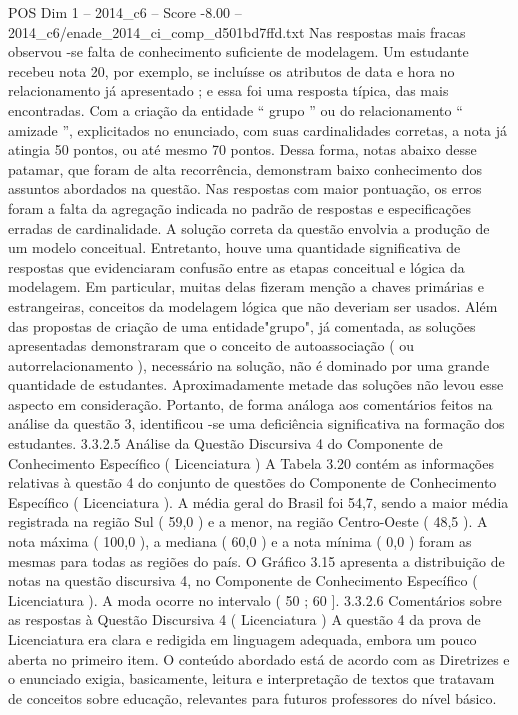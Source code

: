 \begin{textsample}{POS Dim 1 – 2014\_c6 – Score -8.00 – 2014\_c6/enade\_2014\_ci\_comp\_d501bd7ffd.txt}
Nas respostas mais fracas observou -se falta de conhecimento suficiente de modelagem.
Um estudante recebeu nota 20, por exemplo, se incluísse os atributos de data e hora no relacionamento já apresentado ; e essa foi uma resposta típica, das mais encontradas.
Com a criação da entidade “ grupo ” ou do relacionamento “ amizade ”, explicitados no enunciado, com suas cardinalidades corretas, a nota já atingia 50 pontos, ou até mesmo 70 pontos.
Dessa forma, notas abaixo desse patamar, que foram de alta recorrência, demonstram baixo conhecimento dos assuntos abordados na questão.
Nas respostas com maior pontuação, os erros foram a falta da agregação indicada no padrão de respostas e especificações erradas de cardinalidade.
A solução correta da questão envolvia a produção de um modelo conceitual.
Entretanto, houve uma quantidade significativa de respostas que evidenciaram confusão entre as etapas conceitual e lógica da modelagem.
Em particular, muitas delas fizeram menção a chaves primárias e estrangeiras, conceitos da modelagem lógica que não deveriam ser usados.
Além das propostas de criação de uma entidade"grupo", já comentada, as soluções apresentadas demonstraram que o conceito de autoassociação ( ou autorrelacionamento ), necessário na solução, não é dominado por uma grande quantidade de estudantes.
Aproximadamente metade das soluções não levou esse aspecto em consideração.
Portanto, de forma análoga aos comentários feitos na análise da questão 3, identificou -se uma deficiência significativa na formação dos estudantes. 3.3.2.5 Análise da Questão Discursiva 4 do Componente de Conhecimento Específico ( Licenciatura ) A Tabela 3.20 contém as informações relativas à questão 4 do conjunto de questões do Componente de Conhecimento Específico ( Licenciatura ).
A média geral do Brasil foi 54,7, sendo a maior média registrada na região Sul ( 59,0 ) e a menor, na região Centro-Oeste ( 48,5 ).
A nota máxima ( 100,0 ), a mediana ( 60,0 ) e a nota mínima ( 0,0 ) foram as mesmas para todas as regiões do país.
O Gráfico 3.15 apresenta a distribuição de notas na questão discursiva 4, no Componente de Conhecimento Específico ( Licenciatura ).
A moda ocorre no intervalo ( 50 ; 60 ]. 3.3.2.6 Comentários sobre as respostas à Questão Discursiva 4 ( Licenciatura ) A questão 4 da prova de Licenciatura era clara e redigida em linguagem adequada, embora um pouco aberta no primeiro item.
O conteúdo abordado está de acordo com as Diretrizes e o enunciado exigia, basicamente, leitura e interpretação de textos que tratavam de conceitos sobre educação, relevantes para futuros professores do nível básico.

\end{textsample}
